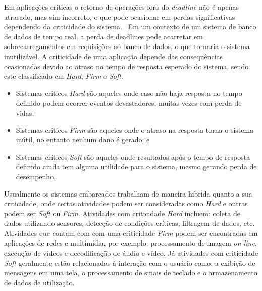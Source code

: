 Em aplicações críticas o retorno de operações fora do \textit{deadline} não é apenas atrasado, mas sim incorreto, o que pode ocasionar em perdas significativas dependendo da criticidade do sistema.~\cite{BUTTAZZO:2011} Em um contexto de um sistema de banco de dados de tempo real, a perda de deadlines pode acarretar em sobrecarregamentos em requisições ao banco de dados, o que tornaria o sistema inutilizável. \cite{bd:1991} A criticidade de uma aplicação depende das consequências ocasionadas devido ao atraso no tempo de resposta esperado do sistema, sendo este classificado em \textit{Hard}, \textit{Firm} e \textit{Soft}. \cite{BUTTAZZO:2011} 

\begin{itemize}
\item Sistemas críticos \textit{Hard} são aqueles onde caso não haja resposta no tempo definido podem ocorrer eventos devastadores, muitas vezes com perda de vidas;
\item Sistemas críticos \textit{Firm} são aqueles onde o atraso na resposta torna o sistema inútil, no entanto nenhum dano é gerado; e
\item Sistemas críticos \textit{Soft} são aqueles onde resultados após o tempo de resposta definido ainda tem alguma utilidade para o sistema, mesmo gerando perda de desempenho.
\end{itemize}


Usualmente os sistemas embarcados trabalham de maneira hibrida quanto a sua criticidade, onde certas atividades podem ser consideradas como \textit{Hard} e outras podem ser \textit{Soft} ou \textit{Firm}. Atividades com criticidade \textit{Hard} incluem: coleta de dados utilizando sensores, detecção de condições críticas, filtragem de dados, etc. Atividades que contam com com uma criticidade \textit{Firm} podem ser encontradas em aplicações de redes e multimídia, por exemplo: processamento de imagem \textit{on-line}, execução de vídeos e decodificação de áudio e vídeo. Já atividades com criticidade \textit{Soft} geralmente estão relacionadas à interação com o usuário como: a exibição de mensagens em uma tela, o processamento de sinais de teclado e o armazenamento de dados de utilização. \cite{BUTTAZZO:2011}



